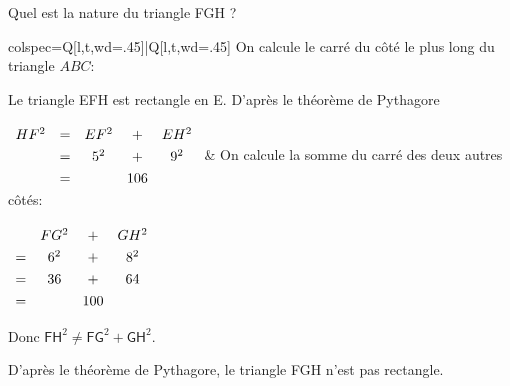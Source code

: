 \documentclass[../main.tex]{subfiles}
\begin{document}
        \begin{exemple}Quel est la nature du triangle \textsf{FGH} ?
            \begin{center}
            \end{center}

            \begin{tblr}{
                colspec={Q[l,t,wd=.45\linewidth]|Q[l,t,wd=.45\linewidth]}
            }
            On calcule le carré du côté le plus long du triangle $ABC$:%
            \par\vspace{5pt}
            Le triangle \textsf{EFH} est rectangle en \textsf{E}. D'après le théorème de Pythagore
            \par\vspace{15pt}
            $\begingroup\renewcommand{\arraystretch}{1.3}
            \begin{array}{ccccc}
                HF^2&=&EF^2&+&EH^2\\
                &=&5^2&+&9^2\\
                &=&&106&
            \end{array}\endgroup
            $
            &
            On calcule la somme du carré des deux autres côtés:\par\vspace{15pt}
            $\begingroup\renewcommand{\arraystretch}{1.3}
            \begin{array}{cccc}
                &FG^2&+&GH^2\\
                =&6^2&+&8^2\\
                =&36&+&64\\
                =&&100&
            \end{array}\endgroup
            $
            \end{tblr}
            \par\vspace{10pt}
            Donc $\textsf{FH}^2\neq\textsf{FG}^2+\textsf{GH}^2$.
            \par\vspace{10pt}
            D'après le théorème de Pythagore, le triangle \textsf{FGH} n'est pas rectangle.
        \end{exemple}
\end{document}
